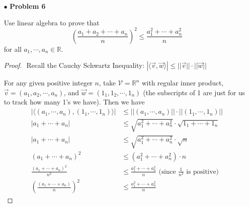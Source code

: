 \documentclass{article}
\begin{document}
\newpage
$ \bullet$ \textbf{Problem 6}
\medskip

\begin{itshape}
Use linear algebra to prove that 
$$ (\frac{a_1+a_2+ \cdots + a_n}{n})^2 \le \frac{a^2_{1}+\cdots +a^2_{n}}{n}$$ for all $a_1, \cdots, a_n \in \mathbb{R}$.
\end{itshape}
\medskip

\begin{proof}
$ $\newline
Recall the Cauchy Schwartz Inequality: $| \langle \vec{v}, \vec{w} \rangle | \le || \vec{v} || \cdot ||\vec{w}||$

For any given positive integer $n$, take $\mathcal{V} = \mathbb{R}^n$ with regular inner product, $\vec{v} = (a_1,a_2, \cdots , a_n)$, and $\vec{w} = (1_1,1_2, \cdots, 1_n)$ (the subscripts of 1 are just for us to track how many 1's we have). Then we have
\begin{align*}
|\langle (a_1, \cdots, a_n), (1_1, \cdots, 1_n) \rangle | &\le || (a_1, \cdots, a_n)|| \cdot || (1_1, \cdots, 1_n) || \\
| a_1 + \cdots + a_n | &\le  \sqrt{a_1^2+ \cdots + a_n^2} \cdot \sqrt{1_1 + \cdots + 1_n} \\
| a_1 + \cdots + a_n | &\le  \sqrt{a_1^2+ \cdots + a_n^2} \cdot \sqrt{n} \\
(a_1 + \cdots + a_n )^2 &\le  (a_1^2+ \cdots + a_n^2) \cdot n\\
\frac{(a_1 + \cdots + a_n )^2}{n^2} &\le  \frac{a_1^2+ \cdots + a_n^2}{n} \text{ (since $\frac{1}{n^2}$ is positive)} \\
(\frac{(a_1 + \cdots + a_n )}{n})^2 &\le  \frac{a_1^2+ \cdots + a_n^2}{n}
\end{align*}
\end{proof}
\end{document}

